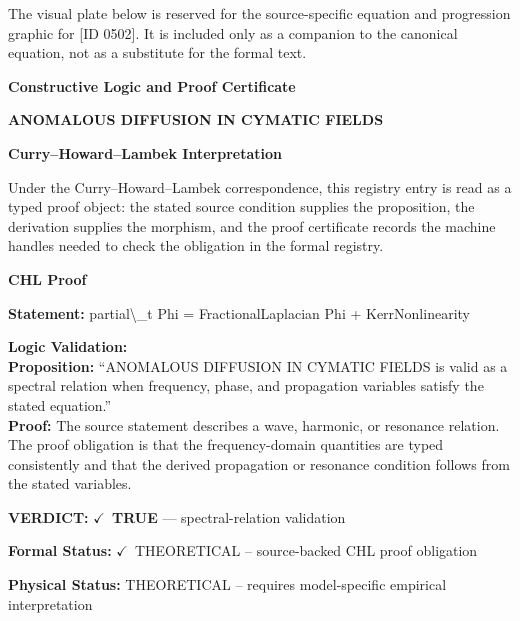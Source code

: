 \begingroup\footnotesize\sloppy
The visual plate below is reserved for the source-specific equation and progression graphic for [ID 0502]. It is included only as a companion to the canonical equation, not as a substitute for the formal text.
\par\endgroup
\ifTZPDarkEdition
{}
\fi

\clearpage
\begingroup\tzpsupportsetup
\noindent\textbf{\fontsize{10.8pt}{12.8pt}\selectfont [ID 0502] Constructive Logic and Proof Certificate}\par
\noindent\textbf{\fontsize{10pt}{12pt}\selectfont ANOMALOUS DIFFUSION IN CYMATIC FIELDS}\par
\vspace{0.45em}
\begingroup
\footnotesize
\setlength{\parskip}{0.22em}
\setlength{\parindent}{0pt}
\noindent\textbf{Curry--Howard--Lambek Interpretation}\par
Under the Curry--Howard--Lambek correspondence, this registry entry is read as a typed proof
object: the stated source condition supplies the proposition, the derivation supplies the
morphism, and the proof certificate records the machine handles needed to check the obligation
in the formal registry.

\vspace{0.45em}
\noindent\textbf{CHL Proof}\par
\textbf{Statement:} partial\textbackslash{}\_t Phi = FractionalLaplacian Phi + KerrNonlinearity

\textbf{Logic Validation:}\\
\textbf{Proposition:} ``ANOMALOUS DIFFUSION IN CYMATIC FIELDS is valid as a spectral relation when frequency,
phase, and propagation variables satisfy the stated equation.''\\
\textbf{Proof:} The source statement describes a wave, harmonic, or resonance relation. The proof
obligation is that the frequency-domain quantities are typed consistently and that the
derived propagation or resonance condition follows from the stated variables.

\textbf{VERDICT:} \ensuremath{\checkmark}\ \textbf{TRUE} --- spectral-relation validation

\textbf{Formal Status:} \ensuremath{\checkmark}\ THEORETICAL -- source-backed CHL proof obligation

\textbf{Physical Status:} THEORETICAL -- requires model-specific empirical interpretation
\par\vspace{0.45em}
\par
\ifTZPDarkEdition
{}
\fi
\endgroup
\endgroup
